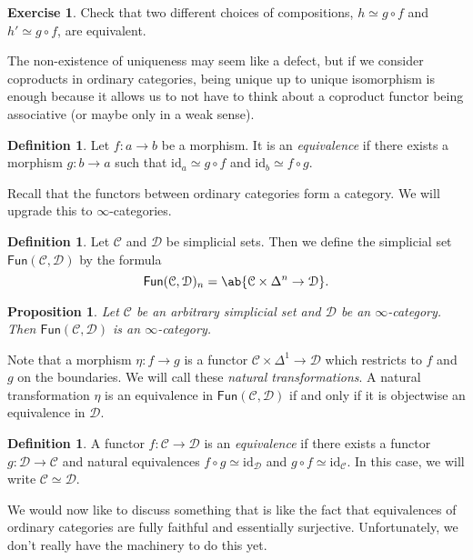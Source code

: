 \documentclass[10pt]{amsart}
\newtheorem{prop}[thm]{Proposition}
\theoremstyle{definition}
\newtheorem{defn}[thm]{Definition}
\newtheorem{exer}[thm]{Exercise}
\theoremstyle{remark}
\theoremstyle{plain}
\theoremstyle{definition}
\theoremstyle{remark}
\newcommand{\mc}[1]{\mathcal{#1}}
\newcommand{\mr}[1]{\mathrm{#1}}
\newcommand{\ms}[1]{\mathsf{#1}}
\newcommand{\1}{\mathbf{1}}
\newcommand{\2}{\mathbf{2}}
\newcommand{\3}{\mathbf{3}}
\begin{document}
\begin{exer}
    Check that two different choices of compositions, $h \simeq g \circ f$ and $h' \simeq g \circ f$, are equivalent.
\end{exer}

The non-existence of uniqueness may seem like a defect, but if we consider coproducts in ordinary categories, being unique up to unique isomorphism is enough because it allows us to not have to think about a coproduct functor being associative (or maybe only in a weak sense).
\begin{defn}
    Let $f \colon a \to b$ be a morphism. It is an \textit{equivalence} if there exists a morphism $g \colon b \to a$ such that $\mr{id}_a \simeq g \circ f$ and $\mr{id}_b \simeq f \circ g$.
\end{defn}

Recall that the functors between ordinary categories form a category. We will upgrade this to $\infty$-categories.
\begin{defn}
    Let $\mc{C}$ and $\mc{D}$ be simplicial sets. Then we define the simplicial set $\ms{Fun}(\mc{C}, \mc{D})$ by the formula
    \[ \ms{Fun}(\mc{C}, \mc{D})_n = \ab\{ \mc{C} \times \Delta^n \to \mc{D} \}. \]
\end{defn}

\begin{prop}
    Let $\mc{C}$ be an arbitrary simplicial set and $\mc{D}$ be an $\infty$-category. Then $\ms{Fun}(\mc{C}, \mc{D})$ is an $\infty$-category.
\end{prop}

Note that a morphism $\eta \colon f \to g$ is a functor $\mc{C} \times \Delta^1 \to \mc{D}$ which restricts to $f$ and $g$ on the boundaries. We will call these \textit{natural transformations}. A natural transformation $\eta$ is an equivalence in $\ms{Fun}(\mc{C}, \mc{D})$ if and only if it is objectwise an equivalence in $\mc{D}$.

\begin{defn}
    A functor $f \colon \mc{C} \to \mc{D}$ is an \textit{equivalence} if there exists a functor $g \colon \mc{D} \to \mc{C}$ and natural equivalences $f \circ g \simeq \mr{id}_{\mc{D}}$ and $g \circ f \simeq \mr{id}_{\mc{C}}$. In this case, we will write $\mc{C} \simeq \mc{D}$.
\end{defn}

We would now like to discuss something that is like the fact that equivalences of ordinary categories are fully faithful and essentially surjective. Unfortunately, we don't really have the machinery to do this yet.
\end{document}
